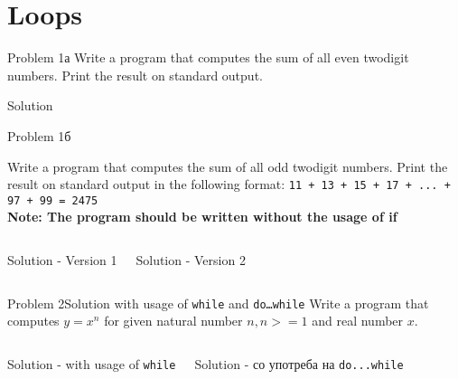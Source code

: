 

\section{Loops}
\begin{frame}[fragile]{Problem 1а}
Write a program that computes the sum of all even twodigit numbers. Print the
result on standard output.
\pause
\begin{exampleblock}{Solution}

\end{exampleblock}
\end{frame}


\begin{frame}[fragile]{Problem 1б}
\begin{scriptsize}
Write a program that computes the sum of all odd twodigit numbers. Print the
result on standard output in the following format:	
\texttt{11 + 13 + 15 + 17 + ... + 97 + 99 = 2475}\\
\textbf{Note: The program should be written without the usage of if}
\end{scriptsize}
\pause
\begin{columns}
\begin{exampleblock}{Solution - Version 1}

\end{exampleblock}
\pause
{}
\begin{exampleblock}{Solution - Version 2}

\end{exampleblock}
\end{columns}
\end{frame}

\begin{frame}[fragile]{Problem 2}{Solution with usage of \texttt{while} and
\texttt{do\ldots while}} 
Write a program that computes $y = x^n$ for given natural number $n, n>=1$ and
real number $x$.
\pause
\begin{columns}
\begin{exampleblock}{Solution - with usage of \texttt{while}}

\end{exampleblock}
\pause
{}
\begin{exampleblock}{Solution - со употреба на \texttt{do...while}}

\end{exampleblock}
\end{columns}
\end{frame}

